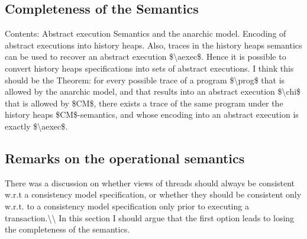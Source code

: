 \documentclass[a4paper,UKenglish]{article}%
\theoremstyle{plain}
\begin{document}
\subsection{Completeness of the Semantics} 
\ac{Contents: Abstract execution Semantics and the anarchic model. 
Encoding of abstract executions into history heaps. Also, 
traces in the history heaps semantics can be used to recover 
an abstract execution $\aexec$. Hence it is possible to convert history heaps 
specifications into sets of abstract executions.
I think this should be the Theorem: for every possible trace of a program $\prog$ that is allowed by the anarchic 
model, and that results into an abstract execution $\chi$ that is allowed by $CM$, there 
exists a trace of the same program under the history heaps $CM$-semantics, 
and whose encoding into an abstract execution is exactly $\aexec$.}
\subsection{Remarks on the operational semantics}
\ac{There was a discussion on whether views of threads should always be consistent w.r.t a 
consistency model specification, or whether they should be consistent only w.r.t. to 
a consistency model specification only prior to executing a transaction.\\ 
In this section I should argue that the first option leads to losing the completeness of the 
semantics.}



\end{document}
